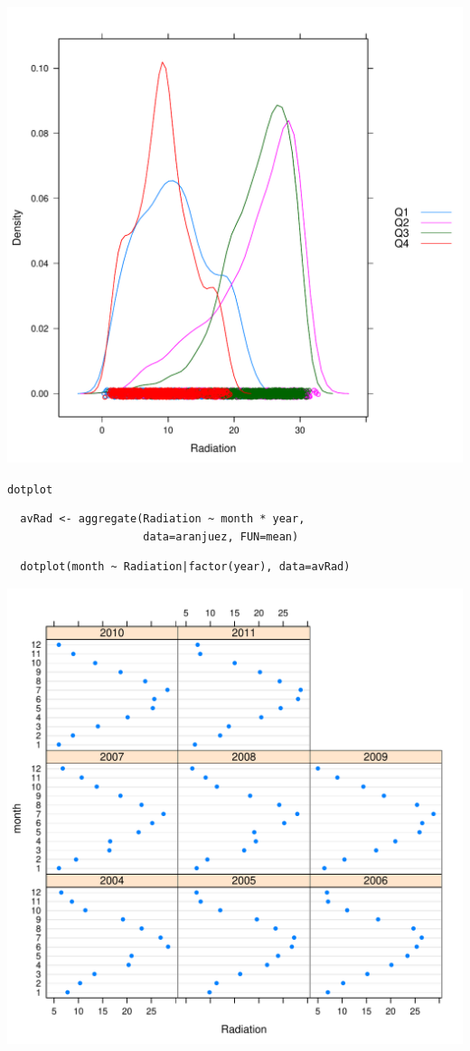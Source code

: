 \documentclass[xcolor={usenames,svgnames,dvipsnames}]{beamer}
\begin{document}
\begin{frame}[label=sec-2-1-47]{}
\includegraphics[width=.9\linewidth]{figs/density.pdf}
\end{frame}

\begin{frame}[fragile,label=sec-2-1-48]{\texttt{dotplot}}
 \lstset{language=R,label= ,caption= ,numbers=none}
\begin{lstlisting}
  avRad <- aggregate(Radiation ~ month * year,
                     data=aranjuez, FUN=mean)
\end{lstlisting}

\lstset{language=R,label= ,caption= ,numbers=none}
\begin{lstlisting}
  dotplot(month ~ Radiation|factor(year), data=avRad)
\end{lstlisting}
\end{frame}

\begin{frame}[label=sec-2-1-49]{}
\includegraphics[width=.9\linewidth]{figs/dotplot.pdf}
\end{frame}
\end{document}
